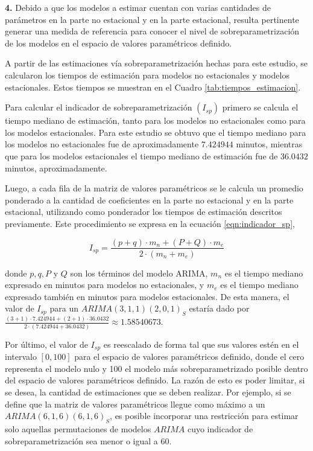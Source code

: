 \documentclass[
]{article}
\begin{document}
\textbf{4.} Debido a que los modelos a estimar cuentan con varias
cantidades de parámetros en la parte no estacional y en la parte
estacional, resulta pertinente generar una medida de referencia para
conocer el nivel de sobreparametrización de los modelos en el espacio de
valores paramétricos definido.

A partir de las estimaciones vía sobreparametrización hechas para este
estudio, se calcularon los tiempos de estimación para modelos no
estacionales y modelos estacionales. Estos tiempos se muestran en el
Cuadro \ref{tab:tiempos_estimacion}.

Para calcular el indicador de sobreparametrización \((I_{sp})\) primero
se calcula el tiempo mediano de estimación, tanto para los modelos no
estacionales como para los modelos estacionales. Para este estudio se
obtuvo que el tiempo mediano para los modelos no estacionales fue de
aproximadamente \(7.424944\) minutos, mientras que para los modelos
estacionales el tiempo mediano de estimación fue de \(36.0432\) minutos,
aproximadamente.

Luego, a cada fila de la matriz de valores paramétricos se le calcula un
promedio ponderado a la cantidad de coeficientes en la parte no
estacional y en la parte estacional, utilizando como ponderador los
tiempos de estimación descritos previamente. Este procedimiento se
expresa en la ecuación \eqref{eqn:indicador_sp},

\begin{equation}
\label{eqn:indicador_sp}
I_{sp} = \frac{(p+q) \cdot m_n + (P+Q) \cdot m_e}{2\cdot(m_n+m_e)}
\end{equation}

donde \(p,q,P\) y \(Q\) son los términos del modelo ARIMA, \(m_n\) es el
tiempo mediano expresado en minutos para modelos no estacionales, y
\(m_e\) es el tiempo mediano expresado también en minutos para modelos
estacionales. De esta manera, el valor de \(I_{sp}\) para un
\(ARIMA(3,1,1)(2,0,1)_S\) estaría dado por
\(\frac{(3+1) \cdot 7.424944 + (2+1) \cdot 36.0432}{2\cdot(7.424944+36.0432)} \approx 1.58540673\).

Por último, el valor de \(I_{sp}\) es reescalado de forma tal que sus
valores estén en el intervalo \([0,100]\) para el espacio de valores
paramétricos definido, donde el cero representa el modelo nulo y 100 el
modelo más sobreparametrizado posible dentro del espacio de valores
paramétricos definido. La razón de esto es poder limitar, si se desea,
la cantidad de estimaciones que se deben realizar. Por ejemplo, si se
define que la matriz de valores paramétricos llegue como máximo a un
\(ARIMA(6,1,6)(6,1,6)_S\), es posible incorporar una restricción para
estimar solo aquellas permutaciones de modelos \(ARIMA\) cuyo indicador
de sobreparametrización sea menor o igual a 60.
\end{document}

